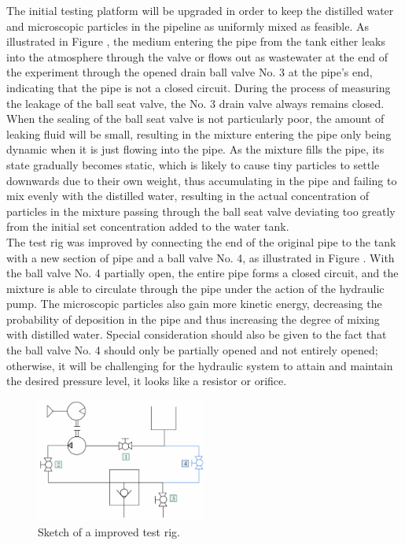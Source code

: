 The initial testing platform will be upgraded in order to keep the distilled water and microscopic
particles in the pipeline as uniformly mixed as feasible. As illustrated in Figure , 
the medium 
entering the pipe from the tank either leaks into the atmosphere through the valve or flows out as 
wastewater at the end of the experiment through the opened drain ball valve No. 3 at the pipe's end, 
indicating that the pipe is not a closed circuit. During the process of measuring the leakage of the 
ball seat valve, the No. 3 drain valve always remains closed. When the sealing of the ball seat valve 
is not particularly poor, the amount of leaking fluid will be small, resulting in the mixture entering 
the pipe only being dynamic when it is just flowing into the pipe. As the mixture fills the pipe, its 
state gradually becomes static, which is likely to cause tiny particles to settle downwards due to their
own weight, thus accumulating in the pipe and failing to mix evenly with the distilled water, resulting 
in the actual concentration of particles in the mixture passing through the ball seat valve 
deviating too greatly from the initial set concentration added to the water tank.\\

The test rig was improved by connecting the end of the original pipe to the tank with a new section of
pipe and a ball valve No. 4, as illustrated in Figure . With the ball valve No. 4 partially open, 
the entire pipe forms a closed circuit, and the mixture is able to circulate through the pipe under 
the action of the hydraulic pump. The microscopic particles also gain more kinetic energy, decreasing 
the probability of deposition in the pipe and thus increasing the degree of mixing with distilled water. 
Special consideration should also be given to the fact that the ball valve No. 4 should only be partially 
opened and not entirely opened; otherwise, it will be challenging for the hydraulic system 
to attain and maintain the desired pressure level, it looks like a resistor or orifice.

\begin{figure}[htbp]
    \centering
    \includegraphics[width=0.5\textwidth]{figures/TestRig/newTestRig.jpg}
    \caption{Sketch of a improved test rig.}
    \label{fig:newTestRig}
\end{figure}



